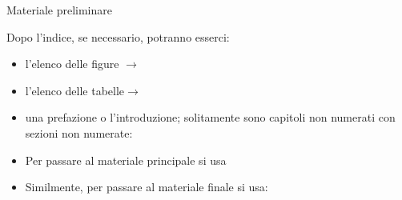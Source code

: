\documentclass{beamer}
\begin{document}
\begin{frame}{Materiale preliminare}

Dopo l'indice, se necessario, potranno esserci:
\begin{itemize}
\item l'elenco delle figure $\rightarrow$ 
\item l'elenco delle tabelle$\rightarrow$ 
\item una prefazione o l'introduzione; solitamente sono capitoli non numerati con sezioni non numerate:
\begin{center}
\Large{} 
\end{center}
\item Per passare al materiale principale si usa
\begin{center}
\Large{}
\end{center}
\item Similmente, per passare al materiale finale si usa:
\begin{center}
\Large{}
\end{center}
\end{itemize}
\end{frame}
\end{document}
